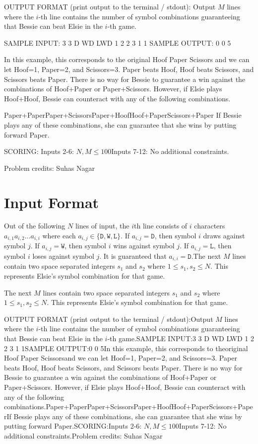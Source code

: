 \documentclass[12pt]{article}
\begin{document}
OUTPUT FORMAT (print output to the terminal / stdout):
Output $M$ lines where the $i$-th line contains the number of symbol
combinations guaranteeing that Bessie can beat Elsie in the $i$-th game.

SAMPLE INPUT:
3 3
D
WD
LWD
1 2
2 3
1 1
SAMPLE OUTPUT: 
0
0
5

In this example, this corresponds to the
original Hoof Paper
Scissors and we can let Hoof=1, Paper=2, and Scissors=3. Paper beats Hoof,
Hoof beats Scissors, and Scissors beats Paper. There is no way for Bessie to
guarantee a win against the combinations of Hoof+Paper or Paper+Scissors.
However, if Elsie plays Hoof+Hoof, Bessie can counteract with any of the
following combinations.

Paper+PaperPaper+ScissorsPaper+HoofHoof+PaperScissors+Paper
If Bessie plays any of these combinations, she can guarantee that she wins by
putting forward Paper.

SCORING:
Inputs 2-6: $N,M\le 100$Inputs 7-12: No additional
constraints.


Problem credits: Suhas Nagar



\section*{Input Format}
Out of the following $N$ lines of input, the $i$th line consists of $i$
characters  $a_{i,1}a_{i,2}\ldots a_{i,i}$ where each
$a_{i,j} \in \{\texttt D,\texttt W,\texttt L\}$. If $a_{i,j} = \texttt D$, then
symbol $i$ draws against symbol $j$.  If $a_{i,j} = \texttt W$, then symbol $i$
wins against symbol $j$. If $a_{i,j} = \texttt L$, then symbol $i$ loses against
symbol $j$. It is guaranteed that $a_{i,i} = \texttt D$.The next $M$ lines contain two space separated integers $s_1$ and $s_2$ where
$1 \leq s_1,s_2 \leq N$. This represents Elsie's symbol combination for that
game.

The next $M$ lines contain two space separated integers $s_1$ and $s_2$ where
$1 \leq s_1,s_2 \leq N$. This represents Elsie's symbol combination for that
game.

OUTPUT FORMAT (print output to the terminal / stdout):Output $M$ lines where the $i$-th line contains the number of symbol
combinations guaranteeing that Bessie can beat Elsie in the $i$-th game.SAMPLE INPUT:3 3
D
WD
LWD
1 2
2 3
1 1SAMPLE OUTPUT:0
0
5In this example, this corresponds to theoriginal Hoof Paper
Scissorsand we can let Hoof=1, Paper=2, and Scissors=3. Paper beats Hoof,
Hoof beats Scissors, and Scissors beats Paper. There is no way for Bessie to
guarantee a win against the combinations of Hoof+Paper or Paper+Scissors.
However, if Elsie plays Hoof+Hoof, Bessie can counteract with any of the
following combinations.Paper+PaperPaper+ScissorsPaper+HoofHoof+PaperScissors+PaperIf Bessie plays any of these combinations, she can guarantee that she wins by
putting forward Paper.SCORING:Inputs 2-6: $N,M\le 100$Inputs 7-12: No additional
constraints.Problem credits: Suhas Nagar
\end{document}
